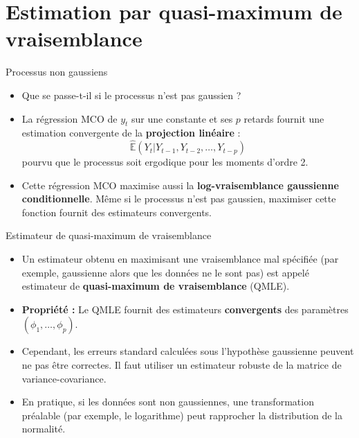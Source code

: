 \documentclass[11pt,aspectratio=169]{beamer}
\newcommand{\E}{\mathbb{E}}
\begin{document}
\section{Estimation par quasi-maximum de vraisemblance}

\begin{frame}{Processus non gaussiens}

\begin{itemize}

\item Que se passe-t-il si le processus n'est pas gaussien ?\newline

\item La régression MCO de $y_t$ sur une constante et ses $p$ retards fournit une estimation convergente de la \textbf{projection linéaire} :
  \[
  \hat{\E}(Y_t | Y_{t-1}, Y_{t-2}, \ldots, Y_{t-p})
  \]
  pourvu que le processus soit ergodique pour les moments d'ordre 2.\newline

\item Cette régression MCO maximise aussi la \textbf{log-vraisemblance gaussienne conditionnelle}. Même si le processus n'est pas gaussien, maximiser cette fonction fournit des estimateurs convergents.

\end{itemize}

\end{frame}

\begin{frame}{Estimateur de quasi-maximum de vraisemblance}

\begin{itemize}

\item Un estimateur obtenu en maximisant une vraisemblance mal spécifiée (par exemple, gaussienne alors que les données ne le sont pas) est appelé estimateur de \textbf{quasi-maximum de vraisemblance} (QMLE).\newline

\item \textbf{Propriété :} Le QMLE fournit des estimateurs \textbf{convergents} des paramètres $(\phi_1, \ldots, \phi_p)$.\newline

\item Cependant, les erreurs standard calculées sous l'hypothèse gaussienne peuvent ne pas être correctes. Il faut utiliser un estimateur robuste de la matrice de variance-covariance.\newline

\item En pratique, si les données sont non gaussiennes, une transformation préalable (par exemple, le logarithme) peut rapprocher la distribution de la normalité.

\end{itemize}

\end{frame}
\end{document}
